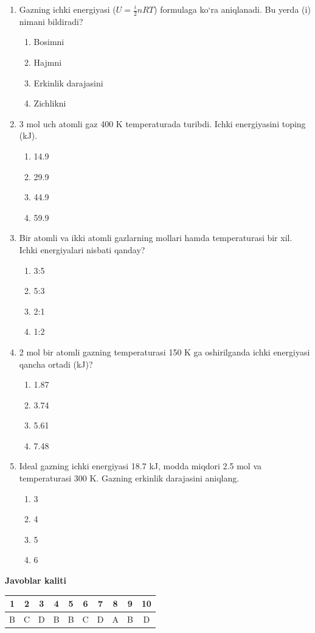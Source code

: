 \begin{enumerate}
\item Gazning ichki energiyasi ($U=\frac{i}{2}nRT$) formulaga ko‘ra aniqlanadi. Bu yerda (i) nimani bildiradi?
\begin{enumerate}[label=\Alph*)]
\item Bosimni
\item Hajmni
\item Erkinlik darajasini
\item Zichlikni
\end{enumerate}

\item 3 mol uch atomli gaz 400 K temperaturada turibdi. Ichki energiyasini toping (kJ).
\begin{enumerate}[label=\Alph*)]
\item 14.9
\item 29.9
\item 44.9
\item 59.9
\end{enumerate}

\item Bir atomli va ikki atomli gazlarning mollari hamda temperaturasi bir xil. Ichki energiyalari nisbati qanday?
\begin{enumerate}[label=\Alph*)]
\item 3:5
\item 5:3
\item 2:1
\item 1:2
\end{enumerate}

\item 2 mol bir atomli gazning temperaturasi 150 K ga oshirilganda ichki energiyasi qancha ortadi (kJ)?
\begin{enumerate}[label=\Alph*)]
\item 1.87
\item 3.74
\item 5.61
\item 7.48
\end{enumerate}

\item Ideal gazning ichki energiyasi 18.7 kJ, modda miqdori 2.5 mol va temperaturasi 300 K. Gazning erkinlik darajasini aniqlang.
\begin{enumerate}[label=\Alph*)]
\item 3
\item 4
\item 5
\item 6
\end{enumerate}
\end{enumerate}



\textbf{Javoblar kaliti}

\begin{center}
\begin{tabular}{|c|c|c|c|c|c|c|c|c|c|}
\hline
1 & 2 & 3 & 4 & 5 & 6 & 7 & 8 & 9 & 10 \\
\hline
B & C & D & B & B & C & D & A & B & D \\
\hline
\end{tabular}
\end{center}